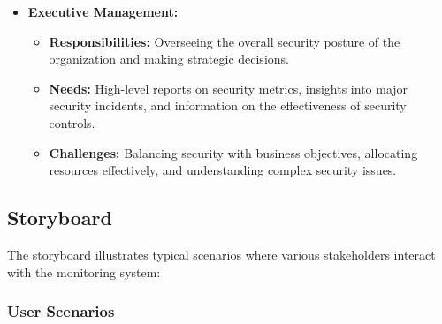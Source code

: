 \documentclass{article}
\begin{document}
\begin{itemize}
        \item \textbf{Executive Management:}
        \begin{itemize}
            \item \textbf{Responsibilities:} Overseeing the overall security posture of the organization and making strategic decisions.
            \item \textbf{Needs:} High-level reports on security metrics, insights into major security incidents, and information on the effectiveness of security controls.
            \item \textbf{Challenges:} Balancing security with business objectives, allocating resources effectively, and understanding complex security issues.
        \end{itemize}
    \end{itemize}

    \subsection{Storyboard}\label{subsec:storyboard}
    The storyboard illustrates typical scenarios where various stakeholders interact with the monitoring system:

    \subsubsection{User Scenarios}\label{subsubsec:user-scenarios}
\end{document}
